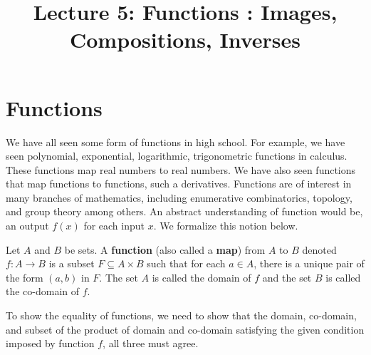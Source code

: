 \documentclass[a4paper,english,12pt]{article}
\begin{document}
\title{Lecture 5: Functions : Images, Compositions, Inverses}
\author{}
\maketitle

\section{Functions}
We have all seen some form of functions in high school. For example, we have seen polynomial, exponential, logarithmic, trigonometric functions in calculus. These functions map real numbers to real numbers. We have also seen functions that map functions to functions, such a derivatives. Functions are of interest in many branches of mathematics, including enumerative combinatorics, topology, and group theory among others. An abstract understanding of function would be, an output $f(x)$ for each input $x$. We formalize this notion below.
\begin{defn} [Function]
 Let $A$ and $B$ be sets. A \textbf{function} (also called a \textbf{map}) from $A$ to $B$ denoted $f: A \to B$ is a subset $F \subseteq A \times B$ such that for each $a \in A$, there is a unique pair of the form $(a,b)$ in $F$. The set $A$ is called the domain of $f$ and the set $B$ is called the co-domain of $f$.
\end{defn}

\begin{rem} To show the equality of functions, we need to show that the domain, co-domain, and subset of the product of domain and co-domain satisfying the given condition imposed by function $f$, all three must agree.
\end{rem}
\end{document}
